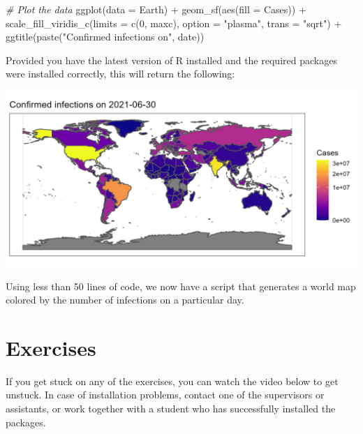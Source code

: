 \documentclass[
]{book}
\newenvironment{Shaded}{\begin{snugshade}}{\end{snugshade}}
\newcommand{\AttributeTok}[1]{\textcolor[rgb]{0.77,0.63,0.00}{#1}}
\newcommand{\CommentTok}[1]{\textcolor[rgb]{0.56,0.35,0.01}{\textit{#1}}}
\newcommand{\DecValTok}[1]{\textcolor[rgb]{0.00,0.00,0.81}{#1}}
\newcommand{\FunctionTok}[1]{\textcolor[rgb]{0.00,0.00,0.00}{#1}}
\newcommand{\NormalTok}[1]{#1}
\newcommand{\SpecialCharTok}[1]{\textcolor[rgb]{0.00,0.00,0.00}{#1}}
\newcommand{\StringTok}[1]{\textcolor[rgb]{0.31,0.60,0.02}{#1}}
\begin{document}
\begin{Shaded}
\begin{Highlighting}[]
\CommentTok{\# Plot the data}
\FunctionTok{ggplot}\NormalTok{(}\AttributeTok{data =}\NormalTok{ Earth) }\SpecialCharTok{+} \FunctionTok{geom\_sf}\NormalTok{(}\FunctionTok{aes}\NormalTok{(}\AttributeTok{fill =}\NormalTok{ Cases)) }\SpecialCharTok{+}
  \FunctionTok{scale\_fill\_viridis\_c}\NormalTok{(}\AttributeTok{limits =} \FunctionTok{c}\NormalTok{(}\DecValTok{0}\NormalTok{, maxc), }\AttributeTok{option =} \StringTok{"plasma"}\NormalTok{, }\AttributeTok{trans =} \StringTok{"sqrt"}\NormalTok{) }\SpecialCharTok{+}
  \FunctionTok{ggtitle}\NormalTok{(}\FunctionTok{paste}\NormalTok{(}\StringTok{"Confirmed infections on"}\NormalTok{, date))}
\end{Highlighting}
\end{Shaded}

Provided you have the latest version of R installed and the required packages were installed correctly, this will return the following:

\includegraphics[width=28in]{figures/COVIDEarth}

Using less than 50 lines of code, we now have a script that generates a world map colored by the number of infections on a particular day.

\hypertarget{exercises-1}{%
\section{Exercises}\label{exercises-1}}

If you get stuck on any of the exercises, you can watch the video below to get unstuck. In case of installation problems, contact one of the supervisors or assistants, or work together with a student who has successfully installed the packages.
\end{document}
